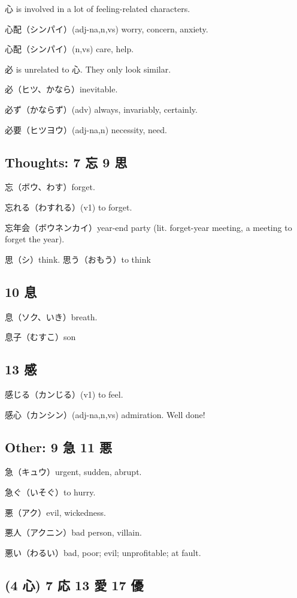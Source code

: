 心 is involved in a lot of feeling-related characters.

心配（シンパイ）(adj-na,n,vs) worry, concern, anxiety.

心配（シンパイ）(n,vs) care, help.

必 is unrelated to 心. They only look similar.

必（ヒツ、かなら）inevitable.

必ず（かならず）(adv) always, invariably, certainly.

必要（ヒツヨウ）(adj-na,n) necessity, need.

\subsection{Thoughts: 7 忘 9 思}

忘（ボウ、わす）forget.

忘れる（わすれる）(v1) to forget.

忘年会（ボウネンカイ）year-end party
(lit. forget-year meeting, a meeting to forget the year).

思（シ）think.
思う（おもう）to think

\subsection{10 息}

息（ソク、いき）breath.

息子（むすこ）son

\subsection{13 感}

感じる（カンじる）(v1) to feel.

感心（カンシン）(adj-na,n,vs) admiration. Well done!

\subsection{Other: 9 急 11 悪}

急（キュウ）urgent, sudden, abrupt.

急ぐ（いそぐ）to hurry.

悪（アク）evil, wickedness.

悪人（アクニン）bad person, villain.

悪い（わるい）bad, poor; evil; unprofitable; at fault.

\subsection{(4 心) 7 応 13 愛 17 優}

